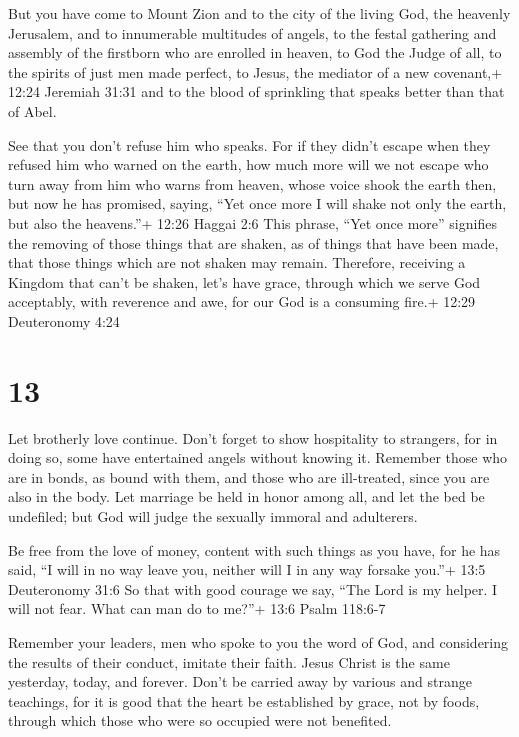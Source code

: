  But you have come to Mount Zion and to the city of the
living God, the heavenly Jerusalem, and to innumerable multitudes of
angels,  to the festal gathering and assembly of the
firstborn who are enrolled in heaven, to God the Judge of all, to the
spirits of just men made perfect,  to Jesus, the mediator
of a new covenant,+ 12:24 Jeremiah 31:31 and to the blood of sprinkling
that speaks better than that of Abel.

 See that you don't refuse him who speaks. For if they
didn't escape when they refused him who warned on the earth, how much
more will we not escape who turn away from him who warns from heaven,
 whose voice shook the earth then, but now he has promised,
saying, ``Yet once more I will shake not only the earth, but also the
heavens.''+ 12:26 Haggai 2:6  This phrase, ``Yet once
more'' signifies the removing of those things that are shaken, as of
things that have been made, that those things which are not shaken may
remain.  Therefore, receiving a Kingdom that can't be
shaken, let's have grace, through which we serve God acceptably, with
reverence and awe,  for our God is a consuming fire.+ 12:29
Deuteronomy 4:24

\hypertarget{section-12}{%
\section{13}\label{section-12}}

 Let brotherly love continue.  Don't forget to
show hospitality to strangers, for in doing so, some have entertained
angels without knowing it.  Remember those who are in bonds,
as bound with them, and those who are ill-treated, since you are also in
the body.  Let marriage be held in honor among all, and let
the bed be undefiled; but God will judge the sexually immoral and
adulterers.

 Be free from the love of money, content with such things as
you have, for he has said, ``I will in no way leave you, neither will I
in any way forsake you.''+ 13:5 Deuteronomy 31:6  So that
with good courage we say, ``The Lord is my helper. I will not fear. What
can man do to me?''+ 13:6 Psalm 118:6-7

 Remember your leaders, men who spoke to you the word of
God, and considering the results of their conduct, imitate their faith.
 Jesus Christ is the same yesterday, today, and forever.
 Don't be carried away by various and strange teachings, for
it is good that the heart be established by grace, not by foods, through
which those who were so occupied were not benefited.

